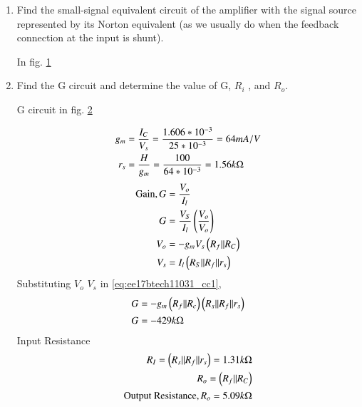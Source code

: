 \begin{enumerate}[label=\thesection.\arabic*.,ref=\thesection.\theenumi]
 \begin{table}[!ht]
\centering

\caption{}
\label{table:ee17btech11031_spice_Table}
\end{table}

\item Find the small-signal equivalent circuit of the amplifier with the signal source represented by its Norton equivalent (as we usually do when the feedback connection at the input is shunt).

\solution
In fig. \ref{fig:ss1 ckt} 
 \begin{figure}[!ht]
 	\begin{center}
 			\resizebox{\columnwidth}{!}{}
 	\end{center}
 \caption{}
 \label{fig:ss1 ckt}
 \end{figure}

\item Find the G circuit and determine the value of G, $R_{i}$ ,
and $R_{o}$.

\solution
G circuit in fig. \ref{fig: ss2 ckt}
 \begin{figure}[!ht]
 	\begin{center}
 			\resizebox{\columnwidth}{!}{}
 	\end{center}
 \caption{}
 \label{fig: ss2 ckt}
 \end{figure}

\begin{align}
    g_{m} &= \frac{I_{C}}{V_{s}}
    = \frac{1.606*10^{-3}}{25*10^{-3}}
    = 64 mA/V\\
    r_{s} &= \frac{H    }{g_{m}} = \frac{100}{64*10^{-3}}
    = 1.56 k \ohm
\end{align}
\begin{align}
    \text{Gain}, G &= \frac{V_{o}}{I_{l}}\\
    G &= \frac{V_{S}}{I_{l}}\brak{\frac{V_{o}}{V_{o}}}
    \label{eq:ee17btech11031_cc1}\\
    V_{o} &= -g_{m}V_{s}\brak{R_{f} || R_{C}} \\
    V_{s} &= I_{l}\brak{R_{S} || R_{f} || r_{s}}
\end{align}
Substituting $V_{o}$ $V_{s}$ in \ref{eq:ee17btech11031_cc1}, 
\begin{align}
    G &= -g_{m} \left(R_{f} || R_{c}\right) \left(R_{s}|| R_{f} || r  _{s}\right)\\
    G &= -429 k\ohm
\end{align}
Input Resistance
\begin{align}
    R_{I} = \left(R_{s} || R_{f} || r_{s}\right) = 1.31 k\ohm\\
    R_{o} = \left(R_{f} || R_{C}\right)\\
    \text{Output Resistance}, R_{o} = 5.09 k\ohm
\end{align}


\end{enumerate}
